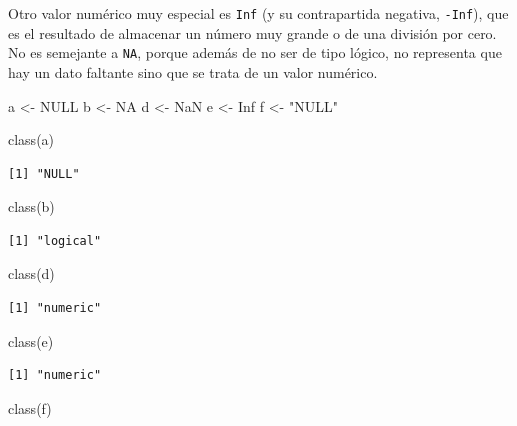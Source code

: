 \documentclass[
]{book}
\newenvironment{Shaded}{\begin{snugshade}}{\end{snugshade}}
\newcommand{\ConstantTok}[1]{\textcolor[rgb]{0.00,0.00,0.00}{#1}}
\newcommand{\FunctionTok}[1]{\textcolor[rgb]{0.00,0.00,0.00}{#1}}
\newcommand{\NormalTok}[1]{#1}
\newcommand{\OtherTok}[1]{\textcolor[rgb]{0.56,0.35,0.01}{#1}}
\newcommand{\StringTok}[1]{\textcolor[rgb]{0.31,0.60,0.02}{#1}}
\begin{document}
Otro valor numérico muy especial es \texttt{Inf} (y su contrapartida negativa, \texttt{-Inf}), que es el resultado de almacenar un número muy grande o de una división por cero. No es semejante a \texttt{NA}, porque además de no ser de tipo lógico, no representa que hay un dato faltante sino que se trata de un valor numérico.

\begin{Shaded}
\begin{Highlighting}[]
\NormalTok{a }\OtherTok{\textless{}{-}} \ConstantTok{NULL}
\NormalTok{b }\OtherTok{\textless{}{-}} \ConstantTok{NA}
\NormalTok{d }\OtherTok{\textless{}{-}} \ConstantTok{NaN}
\NormalTok{e }\OtherTok{\textless{}{-}} \ConstantTok{Inf}
\NormalTok{f }\OtherTok{\textless{}{-}} \StringTok{"NULL"}

\FunctionTok{class}\NormalTok{(a)}
\end{Highlighting}
\end{Shaded}

\begin{verbatim}
[1] "NULL"
\end{verbatim}

\begin{Shaded}
\begin{Highlighting}[]
\FunctionTok{class}\NormalTok{(b)}
\end{Highlighting}
\end{Shaded}

\begin{verbatim}
[1] "logical"
\end{verbatim}

\begin{Shaded}
\begin{Highlighting}[]
\FunctionTok{class}\NormalTok{(d)}
\end{Highlighting}
\end{Shaded}

\begin{verbatim}
[1] "numeric"
\end{verbatim}

\begin{Shaded}
\begin{Highlighting}[]
\FunctionTok{class}\NormalTok{(e)}
\end{Highlighting}
\end{Shaded}

\begin{verbatim}
[1] "numeric"
\end{verbatim}

\begin{Shaded}
\begin{Highlighting}[]
\FunctionTok{class}\NormalTok{(f)}
\end{Highlighting}
\end{Shaded}
\end{document}
